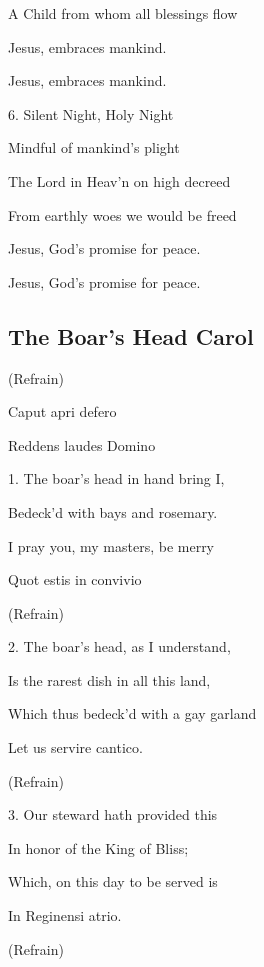 \begin{description}[nosep,leftmargin=\parindent,labelsep=0pt]
\item A Child from whom all blessings flow 
\item Jesus, embraces mankind. 
\item Jesus, embraces mankind. 
\vspace{1.5ex}
\item 6. Silent Night, Holy Night 
\item Mindful of mankind's plight 
\item The Lord in Heav'n on high decreed 
\item From earthly woes we would be freed 
\item Jesus, God's promise for peace. 
\item Jesus, God's promise for peace. 
\end{description}
\subsection{The Boar's Head Carol}\label{boars_head}
\begin{description}[nosep,leftmargin=\parindent,labelsep=0pt]
\item (Refrain) 
\item Caput apri defero 
\item Reddens laudes Domino 
\vspace{1.5ex}
\item 1. The boar’s head in hand bring I, 
\item Bedeck'd with bays and rosemary. 
\item I pray you, my masters, be merry 
\item Quot estis in convivio 
\item (Refrain) 
\vspace{1.5ex}
\item 2. The boar's head, as I understand, 
\item Is the rarest dish in all this land, 
\item Which thus bedeck'd with a gay garland 
\item Let us servire cantico. 
\item (Refrain) 
\vspace{1.5ex}
\item 3. Our steward hath provided this 
\item In honor of the King of Bliss; 
\item Which, on this day to be served is 
\item In Reginensi atrio. 
\item (Refrain) 
\end{description}
